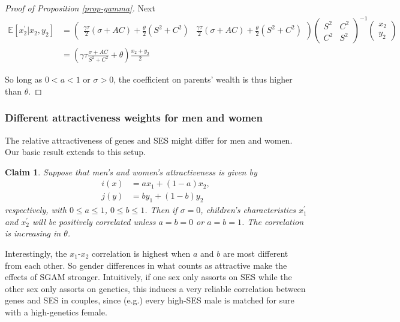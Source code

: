 \documentclass[
  12pt,
]{article}
\newtheorem{claim}{Claim}
\theoremstyle{definition}
\theoremstyle{definition}
\theoremstyle{definition}
\theoremstyle{definition}
\theoremstyle{remark}
\begin{document}
\begin{proof}[Proof of Proposition \ref{prop-gamma}]
Next
\begin{align*}
\mathbb{E}[x_{2}^{\prime}|x_{2},y_{2}] & =\left(\begin{array}{cc}
\frac{\gamma\tau}{2}(\sigma+AC)+\frac{\theta}{2}(S^{2}+C^{2}) & \frac{\gamma\tau}{2}(\sigma+AC)+\frac{\theta}{2}(S^{2}+C^{2})\end{array}\right)\left(\begin{array}{cc}
S^{2} & C^{2}\\
C^{2} & S^{2}
\end{array}\right)^{-1}\left(\begin{array}{c}
x_{2}\\
y_{2}
\end{array}\right)\\
 & =\left(\gamma\tau\frac{\sigma+AC}{S^{2}+C^{2}}+\theta\right)\frac{x_{2}+y_{2}}{2}
\end{align*}

So long as $0<a<1$ or $\sigma>0$, the coefficient on parents' wealth is thus 
higher than $\theta$.

\end{proof}

\subsubsection{Different attractiveness weights for men and women}\label{different-attractiveness-weights-for-men-and-women}

The relative attractiveness of genes and
SES might differ for men and women. Our basic result extends to this setup.

\begin{claim}\label{claim-men-women-different}
Suppose that men's and women's attractiveness is given by
\begin{align*}
i(x) &= ax_1 + (1-a)x_2, \\
j(y) &= by_1 + (1-b)y_2
\end{align*}
respectively, with $0\le a \le 1$, $0 \le b \le 1$. Then if $\sigma = 0$, children's 
characteristics $x^\prime_1$ and $x^\prime_2$ will be positively correlated 
unless $a = b = 0$ or $a = b = 1$. The correlation is increasing in $\theta$.

\end{claim}

Interestingly, the \(x_1\)-\(x_2\) correlation is highest when \(a\) and \(b\) are most
different from each other. So gender differences in what counts as attractive
make the effects of SGAM stronger. Intuitively, if one sex only assorts on
SES while the other sex only assorts on genetics, this induces a very reliable
correlation between genes and SES in couples, since (e.g.) every high-SES male
is matched for sure with a high-genetics female.
\end{document}
